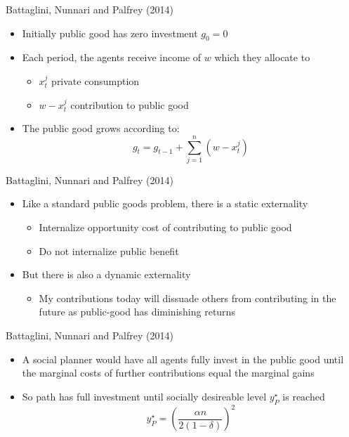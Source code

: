 \documentclass{beamer}
\begin{document}
\begin{frame}{Battaglini, Nunnari and Palfrey (2014)}
\begin{itemize}
	\item Initially public good has zero investment $g_0=0$
	\item Each period, the agents receive income of $w$ which they allocate to
	\begin{itemize}
		\item $x^j_t$ private consumption
		\item $w-x^j_t$ contribution to public good
	\end{itemize}\pause
	\item The public good grows according to:
	$$ g_t=g_{t-1}+\sum^n_{j=1} (w-x^j_t)$$
\end{itemize}
\end{frame}

\begin{frame}{Battaglini, Nunnari and Palfrey (2014)}
	\begin{itemize}
		\item Like a standard public goods problem, there is a static externality
		\begin{itemize}
			\item Internalize opportunity cost of contributing to public good
			\item Do not internalize public benefit
		\end{itemize}\pause
		\item But there is also a dynamic externality
		\begin{itemize}
			\item My contributions today will dissuade others from contributing in the future as public-good has diminishing returns
		\end{itemize}
	\end{itemize}
\end{frame}

\begin{frame}{Battaglini, Nunnari and Palfrey (2014)}
	\begin{itemize}
		\item A social planner would have all agents fully invest in the public good until the marginal costs of further contributions equal the marginal gains
		\item So path has full investment until socially desireable level $y^\star_P$ is reached
		$$	y^\star_P=\left(\dfrac{\alpha n}{2(1-\delta)}\right)^2$$
	\end{itemize}
\end{frame}
\end{document}
